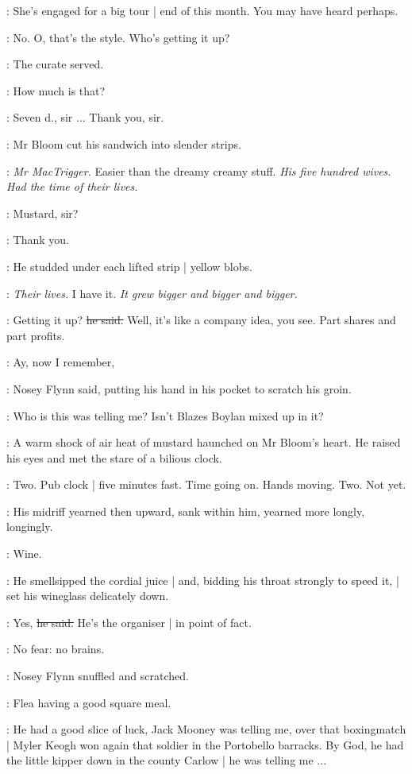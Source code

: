 \Bloom:
She's engaged for a big tour |
end of this month.
You may have heard perhaps.

\nosey:
No.
O, that's the style.
Who's getting it up?

:
The curate served.

\Bloom:
How much is that?

\curate:
Seven d., sir ...
Thank you, sir.

:
Mr Bloom cut his sandwich into slender strips.

\BloomInt:
\emph{Mr MacTrigger.}
Easier than the dreamy creamy stuff.
\emph{His five hundred wives.
Had the time of their lives.}

\curate:
Mustard, sir?

\Bloom:
Thank you.

:
He studded under each lifted strip |
yellow blobs.

\BloomInt:
\emph{Their lives.}
I have it.
\emph{It grew bigger and bigger and bigger.}

\Bloom:
Getting it up?
\sout{he said.}
Well, it's like a company idea, you see.
Part shares and part profits.

\nosey:
Ay, now I remember,

:
Nosey Flynn said,
putting his hand in his pocket to scratch his groin.

\nosey:
Who is this was telling me?
Isn't Blazes Boylan mixed up in it?

:
A warm shock of air heat of mustard
haunched on Mr Bloom's heart.
He raised his eyes and met the stare of a bilious clock.

\BloomInt:
Two.
Pub clock |
five minutes fast.
Time going on.
Hands moving.
Two.
Not yet.

:
His midriff yearned then upward,
sank within him,
yearned more longly,
longingly.

\BloomInt:
Wine.

:
He smellsipped the cordial juice |
and, bidding his throat strongly to speed it, |
set his wineglass delicately down.

\Bloom:
Yes,
\sout{he said.}
He's the organiser |
in point of fact.

\BloomInt:
No fear:
no brains.

:
Nosey Flynn snuffled and scratched.

\BloomInt:
Flea having a good square meal.

\nosey:
He had a good slice of luck,
Jack Mooney was telling me,
over that boxingmatch |
Myler Keogh won again that soldier in the Portobello barracks.
By God,
he had the little kipper down in the county Carlow |
he was telling me ...


